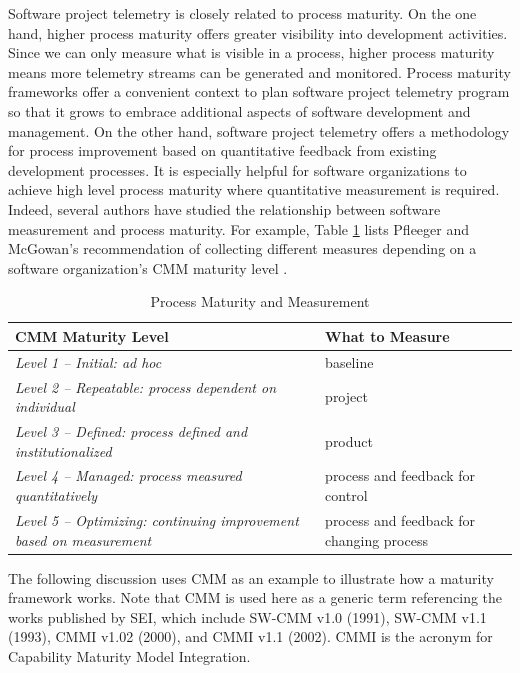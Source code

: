 Software project telemetry is closely related to process maturity. On the one hand, higher process maturity offers greater visibility into development activities. Since we can only measure what is visible in a process, higher process maturity means more telemetry streams can be generated and monitored. Process maturity frameworks offer a convenient context to plan software project telemetry program so that it grows to embrace additional aspects of software development and management. On the other hand, software project telemetry offers a methodology for process improvement based on quantitative feedback from existing development processes. It is especially helpful for software organizations to achieve high level process maturity where quantitative measurement is required.
Indeed, several authors have studied the relationship between software measurement and process maturity. For example, Table \ref{table:Maturity-Measurement} lists Pfleeger and McGowan's recommendation of collecting different measures depending on a software organization's CMM maturity level \cite{Pfleeger:1990}.

\begin{table}[tbp]
	\centering
		\caption{Process Maturity and Measurement}
		\begin{tabular}{|p{}|p{}|}
			\hline
			\textbf{CMM Maturity Level} & \textbf{What to Measure} \\
			\hline 
			\textit{Level 1 -- Initial: ad hoc} & baseline \\
			\hline 
			\textit{Level 2 -- Repeatable: process dependent on individual} & project \\
			\hline 
			\textit{Level 3 -- Defined: process defined and institutionalized} & product \\
			\hline 
			\textit{Level 4 -- Managed: process measured quantitatively} & process and feedback for control \\
			\hline 
			\textit{Level 5 -- Optimizing: continuing improvement based on measurement} & process and feedback for changing process \\
			\hline		
		\end{tabular}
	\label{table:Maturity-Measurement}
\end{table}

The following discussion uses CMM as an example to illustrate how a maturity framework works. Note that CMM is used here as a generic term referencing the works published by SEI, which include SW-CMM v1.0 (1991), SW-CMM v1.1 (1993), CMMI v1.02 (2000), and CMMI v1.1 (2002). CMMI \cite{Royce:2002} is the acronym for Capability Maturity Model Integration.

